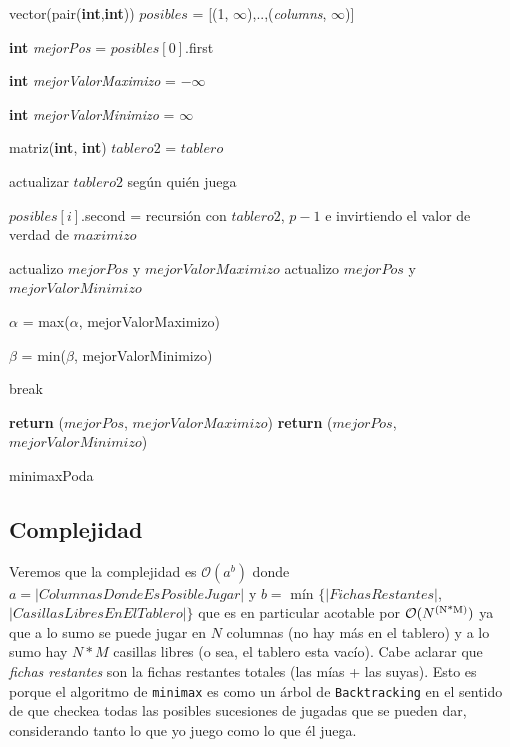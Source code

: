 \documentclass[A4paper,oneside,fleqn,11pt]{article}
\theoremstyle{definition}
\begin{document}
\begin{algorithm}


    
    vector(pair(\textbf{int},\textbf{int})) $posibles$ = [(1, $\infty$),..,(\textit{columns}, $\infty$)]
    
    \textbf{int} \textit{mejorPos} = $posibles[0]$.first
    
    \textbf{int} \textit{mejorValorMaximizo} = $-\infty$
    
    \textbf{int} \textit{mejorValorMinimizo} = $\infty$
    
    	{
    	matriz(\textbf{int}, \textbf{int}) $tablero2$ = $tablero$
    	
    	actualizar $tablero2$ según quién juega
    	
    	
    	$posibles[i]$.second = recursión con $tablero2$, $p-1$ e invirtiendo el valor de verdad de $maximizo$
    	
    		{
    		actualizo $mejorPos$ y $mejorValorMaximizo$
    		}
    		{
    		actualizo $mejorPos$ y $mejorValorMinimizo$
    		}
    		
    	$\alpha$ = max($\alpha$, mejorValorMaximizo)
    	
    	$\beta$ = min($\beta$, mejorValorMinimizo)
    	
    	\If{$\alpha$ $\geq$ $\beta$}
    		{
    		break
    		}
    	}
    	
		{    	
    	\textbf{return} ($mejorPos$, $mejorValorMaximizo$)
    	}
    	{
    	\textbf{return} ($mejorPos$, $mejorValorMinimizo$)
    	}
    
    \caption{minimaxPoda}

\end{algorithm}


\subsection{Complejidad}

Veremos que la complejidad es $\mathcal{O}(a^b)$ donde $a=|Columnas Donde Es Posible Jugar|$ y $b =$ mín $\{|FichasRestantes|$, $|Casillas Libres En El Tablero|\}$ que es en particular acotable por $\mathcal{O}(N\textsuperscript{(N*M)})$ ya que a lo sumo se puede jugar en $N$ columnas (no hay más en el tablero) y a lo sumo hay $N*M$ casillas libres (o sea, el tablero esta vacío). Cabe aclarar que \textit{fichas restantes} son la fichas restantes totales (las mías + las suyas). Esto es porque el algoritmo de \texttt{minimax} es como un árbol de \texttt{Backtracking} en el sentido de que checkea todas las posibles sucesiones de jugadas que se pueden dar, considerando tanto lo que yo juego como lo que él juega.
\end{document}
